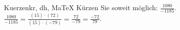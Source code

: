 \begin{MAufgabe}{Kuerzen}{kr, dh, MaTeX}
K\"urzen Sie soweit m\"oglich: $\frac{1080}{-1185}$.\\ 
\ifLsg\MLoesung
\quad $\frac{1080}{-1185}=\frac{(15)\cdot(72)}{(15)\cdot(-79)}=\frac{72}{-79}=\frac{-72}{79}$.\else\relax\fi
 \end{MAufgabe}